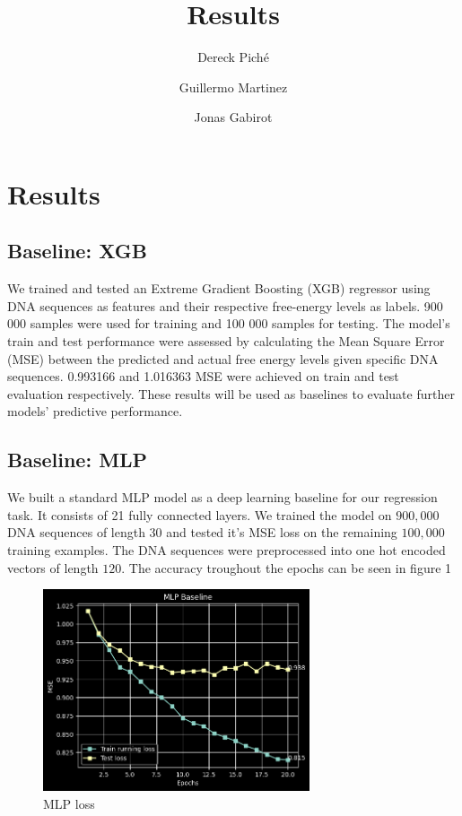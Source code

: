 \documentclass{article}
\title{Results}
\author
{
    Dereck Piché \and
    Guillermo Martinez \and
    Jonas Gabirot \and
}
\begin{document}
\maketitle

\section{Results}

\subsection{Baseline: XGB}
We trained and tested an Extreme Gradient Boosting (XGB) regressor using DNA sequences as features and their respective free-energy levels as labels. 900 000 samples were used for training and 100 000 samples for testing. The model's train and test performance were assessed by calculating the Mean Square Error (MSE) between the predicted and actual free energy levels given specific DNA sequences. 0.993166 and 1.016363 MSE were achieved on train and test evaluation respectively. These results will be used as baselines to evaluate further models' predictive performance.


\subsection{Baseline: MLP}
We built a standard MLP model as a deep learning baseline for our regression task. It consists of 21 fully connected layers. We trained the model on $900, 000$ DNA sequences of length $30$ and tested it's MSE loss on the remaining $100,000$ training examples. The DNA sequences were preprocessed into one hot encoded vectors of length $120$. The accuracy troughout the epochs can be seen in figure 1 
\begin{figure} \label{fig:mlp}
    \caption{MLP loss} \center
    \includegraphics[width=0.7\textwidth]{images/mlp.png}
\end{figure}
\end{document}

